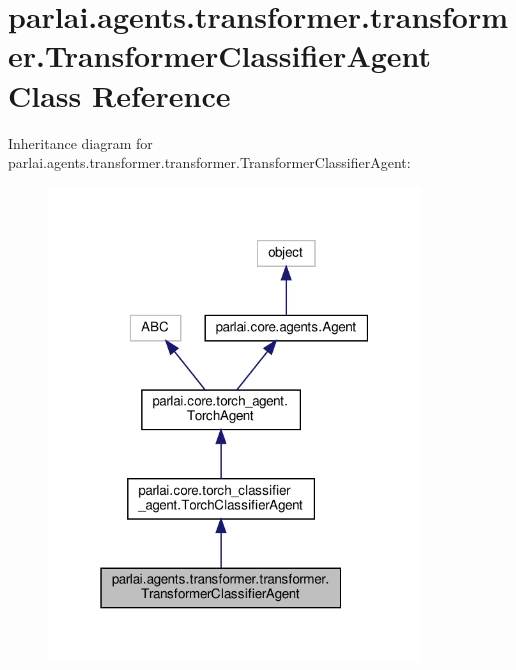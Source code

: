 \hypertarget{classparlai_1_1agents_1_1transformer_1_1transformer_1_1TransformerClassifierAgent}{}\section{parlai.\+agents.\+transformer.\+transformer.\+Transformer\+Classifier\+Agent Class Reference}
\label{classparlai_1_1agents_1_1transformer_1_1transformer_1_1TransformerClassifierAgent}


Inheritance diagram for parlai.\+agents.\+transformer.\+transformer.\+Transformer\+Classifier\+Agent\+:
\nopagebreak
\begin{figure}[H]
\begin{center}
\leavevmode
\includegraphics[width=280pt]{d0/d50/classparlai_1_1agents_1_1transformer_1_1transformer_1_1TransformerClassifierAgent__inherit__graph}
\end{center}
\end{figure}


